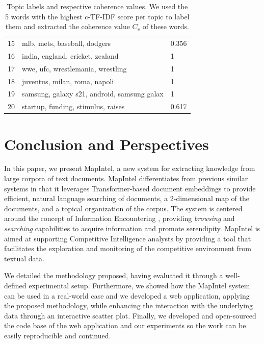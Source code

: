 \documentclass[a4paper]{article}
\begin{document}
\begin{table}[H]
{\begin{tabular}{@{}Sll@{}}
      15                          & mlb, mets, baseball, dodgers                  & 0.356                         \\
      16                          & india, england, cricket, zealand              & 1                             \\
      17                          & wwe, ufc, wrestlemania, wrestling             & 1                             \\
      18                          & juventus, milan, roma, napoli                 & 1                             \\
      19                          & samsung, galaxy s21, android, samsung galax   & 1                             \\
      20                          & startup, funding, stimulus, raises            & 0.617                         \\  \bottomrule
    \end{tabular}%
  }
  \caption{Topic labels and respective coherence values. We used the 5 words with the highest c-TF-IDF score per topic to label them and extracted the coherence value $C_v$ of these words.}
  \label{topic_labels}
\end{table}

\section{Conclusion and Perspectives}
In this paper, we present MapIntel, a new system for extracting knowledge from large corpora of text documents. MapIntel differentiates from previous similar systems in that it leverages Transformer-based document embeddings to provide efficient, natural language searching of documents, a 2-dimensional map of the documents, and a topical organization of the corpus. The system is centered around the concept of Information Encountering \citet{erdelez2020}, providing \emph{browsing} and \emph{searching} capabilities to acquire information and promote serendipity. MapIntel is aimed at supporting Competitive Intelligence analysts by providing a tool that facilitates the exploration and monitoring of the competitive environment from textual data.

We detailed the methodology proposed, having evaluated it through a well-defined experimental setup. Furthermore, we showed how the MapIntel system can be used in a real-world case and we developed a web application, applying the proposed methodology, while enhancing the interaction with the underlying data through an interactive scatter plot. Finally, we developed and open-sourced the code base of the web application and our experiments so the work can be easily reproducible and continued.
\end{document}
